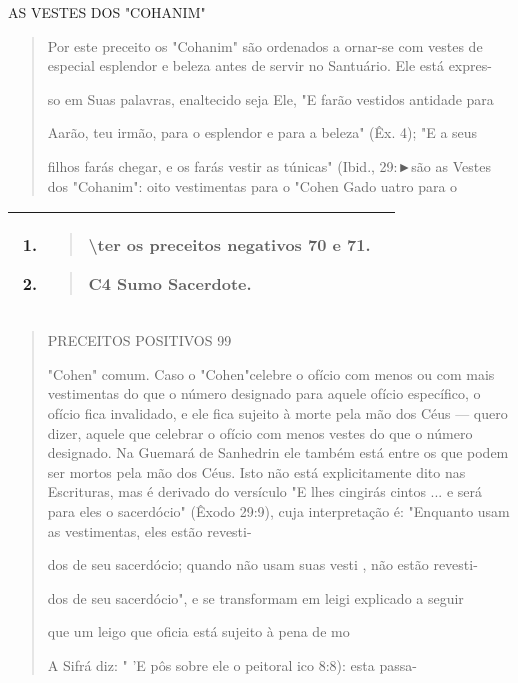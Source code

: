 AS VESTES DOS "COHANIM"

\begin{quote}
Por este preceito os "Cohanim" são ordenados a ornar-se com ves­tes de
especial esplendor e beleza antes de servir no Santuário. Ele está
expres-

so em Suas palavras, enaltecido seja Ele, "E farão vestidos antidade
para

Aarão, teu irmão, para o esplendor e para a beleza" (Êx. 4); "E a seus

filhos farás chegar, e os farás vestir as túnicas" (Ibid., 29:►são as
Vestes\\
dos "Cohanim": oito vestimentas para o "Cohen Gado uatro para o
\end{quote}

\begin{longtable}[]{@{}ll@{}}
\toprule
\endhead
\begin{minipage}[t]{0.47\columnwidth}\raggedright
\begin{enumerate}
\def\labelenumi{\arabic{enumi}.}
\setcounter{enumi}{50}
\item
  \begin{quote}
  \textbackslash ter os preceitos negativos 70 e 71.
  \end{quote}
\item
  \begin{quote}
  C4 Sumo Sacerdote.
  \end{quote}
\end{enumerate}\strut
\end{minipage} & \begin{minipage}[t]{0.47\columnwidth}\raggedright
\strut
\end{minipage}\tabularnewline
\bottomrule
\end{longtable}

\begin{quote}
PRECEITOS POSITIVOS 99

"Cohen" comum. Caso o "Cohen"celebre o ofício com menos ou com mais
vestimentas do que o número designado para aquele ofício específico, o
ofício fica invalidado, e ele fica sujeito à morte pela mão dos Céus ---
quero dizer, aquele que celebrar o ofício com menos vestes do que o
número designado. Na Guemará de Sanhedrin ele também está entre os que
podem ser mortos pela mão dos Céus. Isto não está explicitamente dito
nas Escrituras, mas é derivado do versículo "E lhes cingirás cintos ...
e será para eles o sacerdócio" (Êxodo 29:9), cuja interpretação é:
"Enquanto usam as vestimentas, eles estão revesti-

dos de seu sacerdócio; quando não usam suas vesti , não estão revesti-

dos de seu sacerdócio", e se transformam em leigi explicado a seguir

que um leigo que oficia está sujeito à pena de mo

A Sifrá diz: " 'E pôs sobre ele o peitoral ico 8:8): esta passa-
\end{quote}

